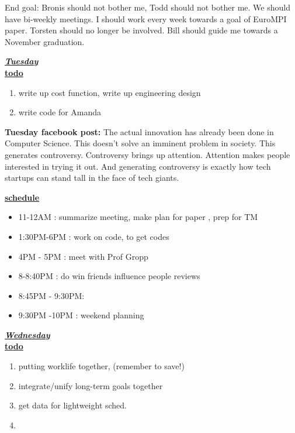 End goal: Bronis should not bother me, Todd should not bother me. We should have bi-weekly meetings.
I should work every week towards a goal of EuroMPI paper. Torsten should no longer be involved.
Bill should guide me towards a November graduation.

\underline{\textbf{\textit{Tuesday}}}\\
\underline{\textbf{todo}}\\
\begin{enumerate}
\item write up cost function, write up engineering design  
\item write code for Amanda
\end{enumerate}

\textbf{Tuesday facebook post: } The actual innovation has already been done in Computer Science.
This doesn't solve an imminent problem in society. This generates controversy.
Controversy brings up attention. Attention makes people interested in trying it out.
And generating controversy is exactly how tech startups can stand tall in the face of tech giants.

\underline{\textbf{schedule}}\\
\begin{itemize}
\item 11-12AM :  summarize meeting, make plan for paper , prep for TM
\item 1:30PM-6PM : work on code, to get codes
\item 4PM - 5PM : meet with Prof Gropp
\item 8-8:40PM :  do win friends influence people reviews
\item 8:45PM - 9:30PM:
\item 9:30PM -10PM : weekend planning
\end{itemize}

\underline{\textbf{\textit{Wednesday}}}\\
\underline{\textbf{todo}}\\
\begin{enumerate}
\item putting worklife together, (remember to save!) 
\item integrate/unify long-term goals together 
\item get data for lightweight sched.
\item
\end{enumerate}

